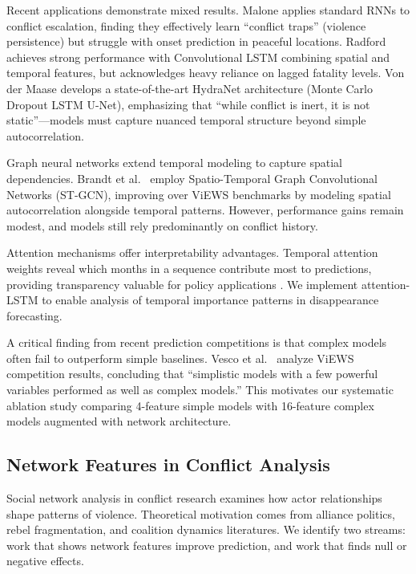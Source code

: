 \documentclass[pdflatex,sn-mathphys-num]{sn-jnl}%
\theoremstyle{thmstyleone}%
\theoremstyle{thmstyletwo}%
\theoremstyle{thmstylethree}%
\begin{document}
Recent applications demonstrate mixed results. Malone \cite{malone2022recurrent} applies standard RNNs to conflict escalation, finding they effectively learn ``conflict traps'' (violence persistence) but struggle with onset prediction in peaceful locations. Radford \cite{radford2022high} achieves strong performance with Convolutional LSTM combining spatial and temporal features, but acknowledges heavy reliance on lagged fatality levels. Von der Maase \cite{vondermaase2025hydranet} develops a state-of-the-art HydraNet architecture (Monte Carlo Dropout LSTM U-Net), emphasizing that ``while conflict is inert, it is not static''---models must capture nuanced temporal structure beyond simple autocorrelation.

Graph neural networks extend temporal modeling to capture spatial dependencies. Brandt et al.~\cite{brandt2022stgcn} employ Spatio-Temporal Graph Convolutional Networks (ST-GCN), improving over ViEWS benchmarks by modeling spatial autocorrelation alongside temporal patterns. However, performance gains remain modest, and models still rely predominantly on conflict history.

Attention mechanisms offer interpretability advantages. Temporal attention weights reveal which months in a sequence contribute most to predictions, providing transparency valuable for policy applications \cite{malhotra2015long}. We implement attention-LSTM to enable analysis of temporal importance patterns in disappearance forecasting.

A critical finding from recent prediction competitions is that complex models often fail to outperform simple baselines. Vesco et al.~\cite{vesco2022united} analyze ViEWS competition results, concluding that ``simplistic models with a few powerful variables performed as well as complex models.'' This motivates our systematic ablation study comparing 4-feature simple models with 16-feature complex models augmented with network architecture.

\subsection{Network Features in Conflict Analysis}

Social network analysis in conflict research examines how actor relationships shape patterns of violence. Theoretical motivation comes from alliance politics, rebel fragmentation, and coalition dynamics literatures. We identify two streams: work that shows network features improve prediction, and work that finds null or negative effects.
\end{document}
